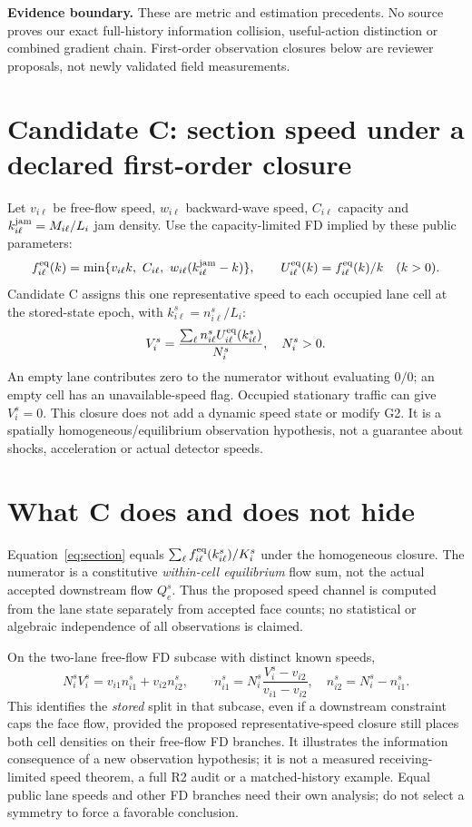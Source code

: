 \documentclass[10pt,a4paper]{article}
\begin{document}
\textbf{Evidence boundary.} These are metric and estimation precedents.
No source proves our exact full-history information collision, useful-action
distinction or combined gradient chain. First-order observation closures below
are reviewer proposals, not newly validated field measurements.

\section{Candidate C: section speed under a declared first-order closure}
Let $v_{i\ell}$ be free-flow speed, $w_{i\ell}$ backward-wave speed,
$C_{i\ell}$ capacity and $k_{i\ell}^{\rm jam}=M_{i\ell}/L_i$ jam density.
Use the capacity-limited FD implied by these public parameters:
\begin{equation}
f_{i\ell}^{\rm eq}(k)=\min\{v_{i\ell}k,\ C_{i\ell},\
w_{i\ell}(k_{i\ell}^{\rm jam}-k)\},\qquad
U_{i\ell}^{\rm eq}(k)=f_{i\ell}^{\rm eq}(k)/k\quad(k>0).
\end{equation}
Candidate C assigns this one representative speed to each occupied lane cell
at the stored-state epoch, with $k_{i\ell}^s=n_{i\ell}^s/L_i$:
\begin{equation}
V_i^s=\frac{\sum_\ell n_{i\ell}^s U_{i\ell}^{\rm eq}(k_{i\ell}^s)}{N_i^s},
\quad N_i^s>0.
\label{eq:section}
\end{equation}
An empty lane contributes zero to the numerator without evaluating $0/0$;
an empty cell has an unavailable-speed flag. Occupied stationary traffic can
give $V_i^s=0$. This closure does not add a dynamic speed state or modify G2.
It is a spatially homogeneous/equilibrium observation hypothesis, not a
guarantee about shocks, acceleration or actual detector speeds.
\newpage

\section{What C does and does not hide}
Equation~\eqref{eq:section} equals
$\sum_\ell f_{i\ell}^{\rm eq}(k_{i\ell}^s)/K_i^s$ under the homogeneous
closure. The numerator is a constitutive \emph{within-cell equilibrium} flow
sum, not the actual accepted downstream flow $Q_e^s$. Thus the proposed speed
channel is computed from the lane state separately from accepted face counts;
no statistical or algebraic independence of all observations is claimed.

On the two-lane free-flow FD subcase with distinct known speeds,
\begin{equation}
N_i^s V_i^s=v_{i1}n_{i1}^s+v_{i2}n_{i2}^s,\qquad
n_{i1}^s=N_i^s\frac{V_i^s-v_{i2}}{v_{i1}-v_{i2}},\quad
n_{i2}^s=N_i^s-n_{i1}^s.
\end{equation}
This identifies the \emph{stored} split in that subcase, even if a downstream
constraint caps the face flow, provided the proposed representative-speed
closure still places both cell densities on their free-flow FD branches.
It illustrates the information consequence of a new observation hypothesis;
it is not a measured receiving-limited speed theorem, a full R2 audit or a
matched-history example. Equal public lane speeds and other FD branches need
their own analysis; do not select a symmetry to force a favorable conclusion.
\end{document}
